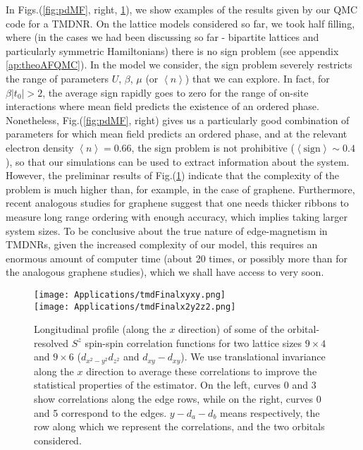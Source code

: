 In Figs.(\ref{fig:pdMF}, right, \ref{fig:tmd-data}), we show examples of the results given by our \ac{QMC} code for a \acs{TMDNR}.
On the lattice models considered so far, we took half filling, where (in the cases we had been discussing so far - bipartite lattices and particularly symmetric Hamiltonians) there is no sign problem (see appendix \ref{ap:theoAFQMC}).
In the model we consider, the sign problem severely restricts the range of parameters $U$, $\beta$, $\mu$ (or $\left\langle n \right\rangle$) that we can explore.
In fact, for $\beta |  t_0 | > 2$, the average sign rapidly goes to zero for the range of on-site interactions where mean field predicts the existence of an ordered phase.
Nonetheless, Fig.(\ref{fig:pdMF}, right) gives us a particularly good combination of parameters for which mean field predicts an ordered phase, and at the relevant electron density $\left\langle n \right\rangle = 0.66$, the sign problem is not prohibitive ($\left\langle \text{sign} \right\rangle \sim0.4$), so that our simulations can be used to extract information about the system.
However, the preliminar results of Fig.(\ref{fig:tmd-data}) indicate that the complexity of the problem is much higher than, for example, in the case of graphene.
Furthermore, recent analogous studies for graphene \cite{feldner_dynamical_2011, yang_strain-tuning_2017,raczkowski_interplay_2017} suggest that one needs thicker ribbons to measure long range ordering with enough accuracy, which implies taking larger system sizes.
To be conclusive about the true nature of edge-magnetism in \ac{TMDNR}s, given the increased complexity of our model, this requires an enormous amount of computer time (about 20 times, or possibly more than for the analogous graphene studies), which we shall have access to very soon.
\vspace{-0.2cm}
\begin{figure}[H]
\centering
\texttt{[image: Applications/tmdFinalxyxy.png]} \\
\hspace{-0.5cm}\texttt{[image: Applications/tmdFinalx2y2z2.png]}
	\caption[Longitudinal profile (along the $x$ direction) of orbital-resolved $S^z$ spin-spin correlation functions we measured, for two lattice sizes: $9 \times 4$ and $9 \times 6$.]{Longitudinal profile (along the $x$ direction) of some of the orbital-resolved $S^z$ spin-spin correlation functions for two lattice sizes $9 \times 4$ and $9 \times 6$ ($d_{x^2-y^2} d_{z^2}$ and $d_{xy} - d_{xy}$).
	We use translational invariance along the $x$ direction to average these correlations to improve the statistical properties of the estimator.
	On the left, curves 0 and 3 show correlations along the edge rows, while on the right, curves 0 and 5 correspond to the edges.
	$y - d_a - d_b$ means respectively, the row  along which we represent the correlations, and the two orbitals considered.}
	\label{fig:tmd-data}
\end{figure}

